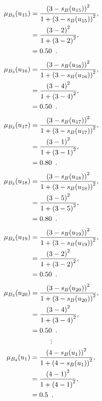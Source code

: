 \documentclass[a4paper,openany]{book}
\begin{document}
				\begin{align}
					\mu_{B_3}(u_{15}) &= \frac{\left(3-s_B(u_{15})\right)^2}{1 + \left(3-s_B(u_{15})\right)^2} ,\\
					&= \frac{\left(3-2\right)^2}{1 + \left(3-2\right)^2} \notag ,\\
					&= 0.50 \enspace. \notag
				\end{align}
				\begin{align}
					\mu_{B_3}(u_{16}) &= \frac{\left(3-s_B(u_{16})\right)^2}{1 + \left(3-s_B(u_{16})\right)^2} ,\\
					&= \frac{\left(3-4\right)^2}{1 + \left(3-4\right)^2} \notag ,\\
					&= 0.50 \enspace. \notag
				\end{align}
				\begin{align}
					\mu_{B_3}(u_{17}) &= \frac{\left(3-s_B(u_{17})\right)^2}{1 + \left(3-s_B(u_{17})\right)^2} ,\\
					&= \frac{\left(3-1\right)^2}{1 + \left(3-1\right)^2} \notag ,\\
					&= 0.80 \enspace. \notag
				\end{align}
				\begin{align}
					\mu_{B_3}(u_{18}) &= \frac{\left(3-s_B(u_{18})\right)^2}{1 + \left(3-s_B(u_{18})\right)^2} ,\\
					&= \frac{\left(3-5\right)^2}{1 + \left(3-5\right)^2} \notag ,\\
					&= 0.80 \enspace. \notag
				\end{align}
				\begin{align}
					\mu_{B_3}(u_{19}) &= \frac{\left(3-s_B(u_{19})\right)^2}{1 + \left(3-s_B(u_{19})\right)^2} ,\\
					&= \frac{\left(3-2\right)^2}{1 + \left(3-2\right)^2} \notag ,\\
					&= 0.50 \enspace. \notag
				\end{align}
				\begin{align}
					\mu_{B_3}(u_{20}) &= \frac{\left(3-s_B(u_{20})\right)^2}{1 + \left(3-s_B(u_{20})\right)^2} ,\\
					&= \frac{\left(3-4\right)^2}{1 + \left(3-4\right)^2} \notag ,\\
					&= 0.50 \enspace. \notag
				\end{align}
				\[
					\vdots
				\]
				\begin{align}
					\mu_{B_4}(u_1) &= \frac{\left(4-s_B(u_1)\right)^2}{1 + \left(4-s_B(u_1)\right)^2} ,\\
					&= \frac{\left(4-1\right)^2}{1 + \left(4-1\right)^2} \notag ,\\
					&= 0.5 \enspace. \notag
				\end{align}
\end{document}
